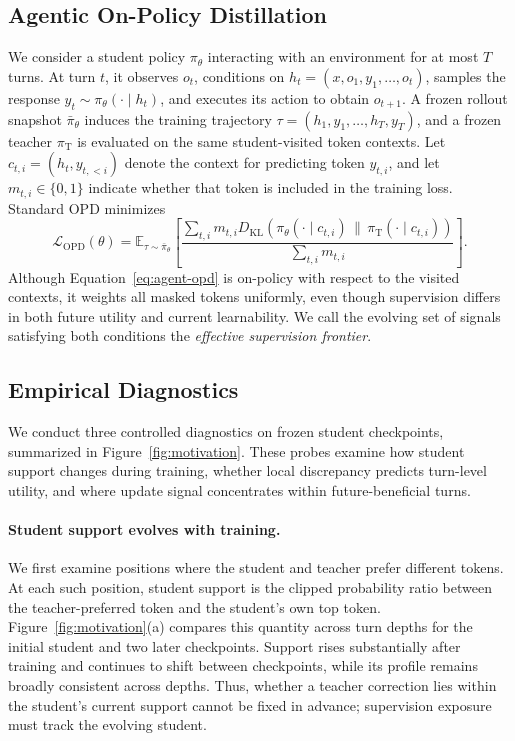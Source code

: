 \documentclass{article}
\begin{document}
\subsection{Agentic On-Policy Distillation}

We consider a student policy $\pi_\theta$ interacting with an environment for at most $T$ turns.
At turn $t$, it observes $o_t$, conditions on
$h_t=(x,o_1,y_1,\ldots,o_t)$, samples the response $y_t\sim\pi_\theta(\cdot\mid h_t)$,
and executes its action to obtain $o_{t+1}$.  A frozen rollout snapshot
$\bar\pi_\theta$ induces the training trajectory
$\tau=(h_1,y_1,\ldots,h_T,y_T)$, and a frozen teacher $\pi_{\mathrm T}$ is evaluated
on the same student-visited token contexts.  Let $c_{t,i}=(h_t,y_{t,<i})$ denote the context for
predicting token $y_{t,i}$, and let $m_{t,i}\in\{0,1\}$ indicate whether that token is included in
the training loss.  Standard OPD minimizes
\begin{equation}
    \mathcal L_{\mathrm{OPD}}(\theta)
    =
    \mathbb E_{\tau\sim\bar\pi_\theta}\!\left[
    \frac{\sum_{t,i}m_{t,i}
    D_{\mathrm{KL}}\!\left(\pi_\theta(\cdot\mid c_{t,i})
    \,\|\,\pi_{\mathrm T}(\cdot\mid c_{t,i})\right)}
    {\sum_{t,i}m_{t,i}}\right].
    \label{eq:agent-opd}
\end{equation}
Although Equation~\ref{eq:agent-opd} is on-policy with respect to the visited contexts, it weights
all masked tokens uniformly, even though supervision differs in both future utility and current
learnability.  We call the evolving set of signals satisfying both conditions the \emph{effective
supervision frontier}.

\subsection{Empirical Diagnostics}

We conduct three controlled diagnostics on frozen student checkpoints, summarized in
Figure~\ref{fig:motivation}.  These probes examine how student support changes during training,
whether local discrepancy predicts turn-level utility, and where update signal concentrates within
future-beneficial turns.

\paragraph{Student support evolves with training.}
We first examine positions where the student and teacher prefer different tokens.  At each such
position, student support is the clipped probability ratio between the teacher-preferred token and
the student's own top token.  Figure~\ref{fig:motivation}(a) compares this quantity across turn
depths for the initial student and two later checkpoints.  Support rises substantially after
training and continues to shift between checkpoints, while its profile remains broadly consistent
across depths.  Thus, whether a teacher correction lies within the student's current support cannot
be fixed in advance; supervision exposure must track the evolving student.
\end{document}
